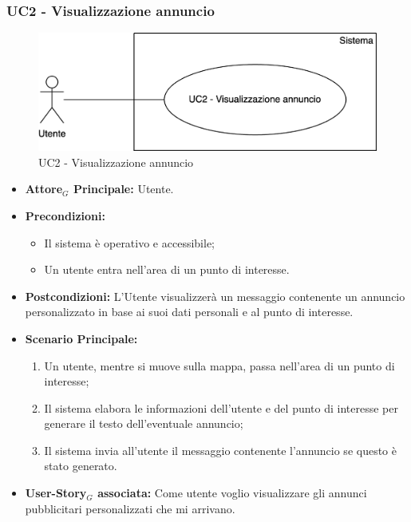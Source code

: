 \documentclass[11pt]{article}
\begin{document}
\begin{justify}
\subsubsection{\textbf{UC2 - Visualizzazione annuncio}}
\begin{figure}[H]
    \centering
    \includegraphics[width=0.7\linewidth]{UC2image.png}
    \caption{UC2 - Visualizzazione annuncio}
    \label{fig:UC2}
\end{figure}
\begin{itemize}
    \item \textbf{Attore$_G$ Principale:} Utente.
    \item \textbf{Precondizioni:} 
        \begin{itemize}
    	\item Il sistema è operativo e accessibile;
    	\item Un utente entra nell'area di un punto di interesse.
        \end{itemize}
    \item \textbf{Postcondizioni:} L'Utente visualizzerà un messaggio contenente un annuncio personalizzato in base ai suoi dati personali e al punto di interesse.
    \item \textbf{Scenario Principale:} 
        \begin{enumerate}
            \item Un utente, mentre si muove sulla mappa, passa nell'area di un punto di interesse;
            \item Il sistema elabora le informazioni dell'utente e del punto di interesse per generare il testo dell'eventuale annuncio;
            \item Il sistema invia all'utente il messaggio contenente l'annuncio se questo è stato generato.
        \end{enumerate}
    \item \textbf{User-Story$_G$ associata:} Come utente voglio visualizzare gli annunci pubblicitari personalizzati che mi arrivano.
\end{itemize}

\end{justify}
\end{document}
